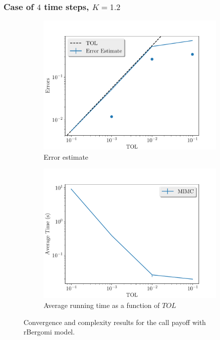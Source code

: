 \documentclass[11pt]{article}
\begin{document}
\subsubsection*{Case of $4$ time steps, $K=1.2$}
\begin{figure}[!h]
	\centering
	\begin{subfigure}{.5\textwidth}
		\centering
		\includegraphics[width=1\linewidth]{./figures/rbergomi_4_steps_K_1_2/error_estimate.pdf}
		\caption{Error estimate}
		\label{fig:misc_rbergomi_4_steps_K_1_2_sub1}
	\end{subfigure}%
	\begin{subfigure}{.5\textwidth}
		\centering
		\includegraphics[width=1\linewidth]{./figures/rbergomi_4_steps_K_1_2/average_running_time.pdf}
		\caption{Average running time as a function of $TOL$}
		\label{fig:misc_rbergomi_4_steps_K_1_2_sub2}
	\end{subfigure}%
	\caption{Convergence and complexity results for the call payoff with rBergomi model.}
	\label{fig:misc_rbergomi_4_steps_K_1_2_1}
\end{figure}
\end{document}
